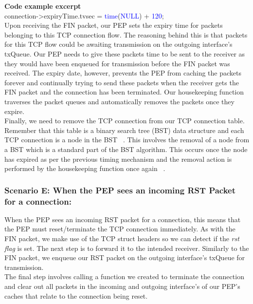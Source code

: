 \noindent \textbf{Code example excerpt}\\
connection->expiryTime.tv\textunderscore sec = \textcolor{blue}{time}(\textcolor{blue}{NULL}) + \textcolor{blue}{120}; \\

Upon receiving the FIN packet, our PEP sets the expiry time for packets belonging to this TCP connection flow. The reasoning behind this is that packets for this TCP flow could be awaiting transmission on the outgoing interface's txQueue. Our PEP needs to give these packets time to be sent to the receiver as they would have been enqueued for transmission before the FIN packet was received. The expiry date, however, prevents the PEP from caching the packets forever and continually trying to send these packets when the receiver gets the FIN packet and the connection has been terminated. Our housekeeping function traverses the packet queues and automatically removes the packets once they expire.\\

Finally, we need to remove the TCP connection from our TCP connection table. Remember that this table is a binary search tree (BST) data structure and each TCP connection is a node in the BST ~\cite{42}. This involves the removal of a node from a BST which is a standard part of the BST algorithm. This occurs once the node has expired as per the previous timing mechanism and the removal action is performed by the housekeeping function once again ~\cite{1}.

\subsubsection{Scenario E: When the PEP sees an incoming RST Packet for a connection:}
When the PEP sees an incoming RST packet for a connection, this means that the PEP must reset/terminate the TCP connection immediately. As with the FIN packet, we make use of the TCP struct headers so we can detect if the \emph{rst flag} is set. The next step is to forward it to the intended receiver. Similarly to the FIN packet, we enqueue our RST packet on the outgoing interface's txQueue for transmission.\\ 

The final step involves calling a function we created to terminate the connection and clear out all packets in the incoming and outgoing interface's of our PEP's caches that relate to the connection being reset. \\

